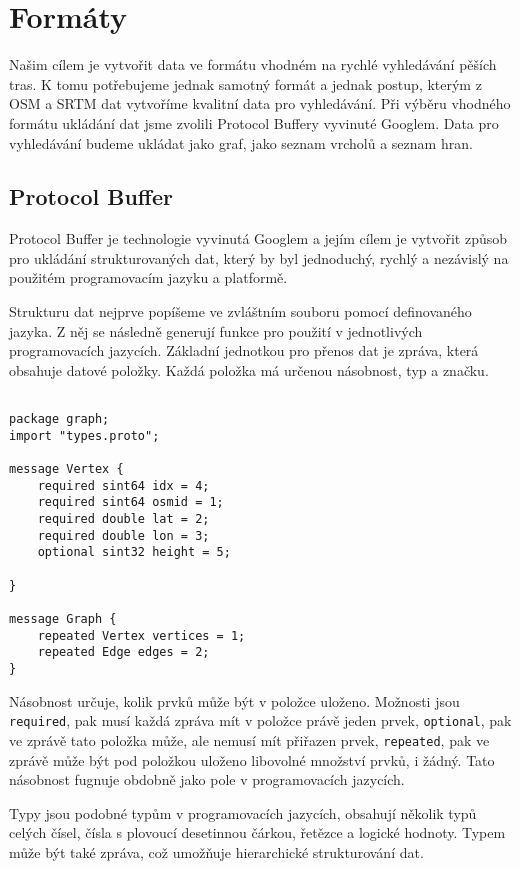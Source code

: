 \chapter{Formáty}
Našim cílem je vytvořit data ve formátu vhodném na rychlé vyhledávání pěších
tras. K tomu potřebujeme jednak samotný formát a jednak postup, kterým z OSM a
SRTM dat vytvoříme kvalitní data pro vyhledávání. Při výběru vhodného formátu
ukládání dat jsme zvolili Protocol Buffery\cite{pbfweb} vyvinuté Googlem. Data
pro vyhledávání budeme ukládat jako graf, jako seznam vrcholů a seznam hran.



\section{Protocol Buffer}
Protocol Buffer je technologie vyvinutá Googlem a jejím cílem je vytvořit způsob
pro ukládání strukturovaných dat, který by byl jednoduchý, rychlý a nezávislý na
použitém programovacím jazyku a platformě. 

Strukturu dat nejprve popíšeme ve zvláštním souboru pomocí definovaného
jazyka\cite{pbfspec}. Z něj se následně generují funkce pro použití v
jednotlivých programovacích jazycích. Základní jednotkou pro přenos dat je
zpráva, která obsahuje datové položky. Každá položka má určenou násobnost, typ a
značku.

\begin{verbatim}

package graph;
import "types.proto";

message Vertex {
	required sint64 idx = 4;
	required sint64 osmid = 1;
	required double lat = 2;
	required double lon = 3;
	optional sint32 height = 5;
	
}

message Graph {
	repeated Vertex vertices = 1;
	repeated Edge edges = 2;
}
\end{verbatim}

{\tuc Násobnost} určuje, kolik prvků může být v položce uloženo. Možnosti jsou
\verb|required|, pak musí každá zpráva mít v položce právě jeden prvek,
\verb|optional|, pak ve zprávě tato položka může, ale nemusí mít přiřazen prvek,
\verb|repeated|, pak ve zprávě může být pod položkou uloženo libovolné množství
prvků, i žádný. Tato násobnost fugnuje obdobně jako pole v programovacích
jazycích. 

{\tuc Typy} jsou podobné typům v programovacích jazycích, obsahují několik typů celých
čísel, čísla s plovoucí desetinnou čárkou, řetězce a logické hodnoty. Typem může
být také zpráva, což umožňuje hierarchické strukturování dat. 

